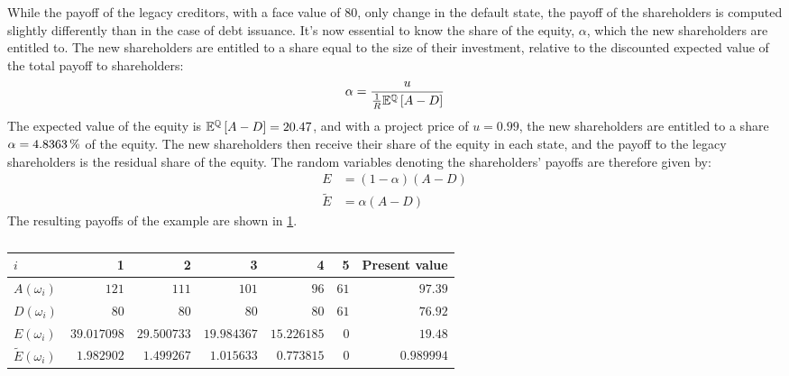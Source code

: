 \documentclass[main.tex]{subfiles}
\begin{document}
        While the payoff of the legacy creditors, with a face value of $\num{80}$, 
        only change in the default state, 
        the payoff of the shareholders is computed slightly differently than in the case of debt issuance. 
        It's now essential to know the share of the equity, $\alpha$, 
        which the new shareholders are entitled to.
        The new shareholders are entitled to a share equal to the size of their investment,
        relative to the discounted expected value of the total payoff to shareholders:
        \begin{equation}
            \alpha = 
                \frac{
                    u
                }{
                    \frac{1}{R}
                    \mathbb{E}^{\mathbb{Q}}\left[
                        A - D
                    \right]
                }
        \end{equation}
        The expected value of the equity is 
        $\mathbb{E}^{\mathbb{Q}}\left[A - D\right] = \num{20.47}$,
        and with a project price of $u = 0.99$, the new shareholders are entitled to a share
        $\alpha = \pct{0.048363}$ of the equity.
        The new shareholders then receive their share of the equity in each state, 
        and the payoff to the legacy shareholders is the residual share of the equity.
        The random variables denoting the shareholders' payoffs are therefore given by:
            \begin{align}
                E 
                &= 
                (1 - \alpha)
                (A - D) 
                \\
                \tilde{E}
                &=
                \alpha
                (A - D)
            \end{align}
        The resulting payoffs of the example are shown in \cref{tbl:equity-funding-payoff}.
        \begin{table}[H]
            \centering\begin{tabular}{l|rrrrr||r}
                $i$ & 1 & 2 & 3 & 4 & 5 & Present value \\
                \hline
                $A(\omega_{i})$ & $\num{121}$ & $\num{111}$ & $\num{101}$ & $\num{96}$ & $\num{61}$ & $\num{97.39}$ \\
                $D(\omega_{i})$ & $\num{80}$ & $\num{80}$ & $\num{80}$ & $\num{80}$ & $\num{61}$ & $\num{76.92}$ \\
                $E(\omega_{i})$ & $\num{39.017098}$ & $\num{29.500733}$ & $\num{19.984367}$ & $\num{15.226185}$ & $\num{0}$ & $\num{19.48}$ \\
                $\tilde{E}(\omega_{i})$ & $\num{1.982902}$ & $\num{1.499267}$ & $\num{1.015633}$ & $\num{0.773815}$ & $\num{0}$ & $\num{0.989994}$ \\
            \end{tabular}
            \caption{}
            \label{tbl:equity-funding-payoff}
        \end{table}
\end{document}
